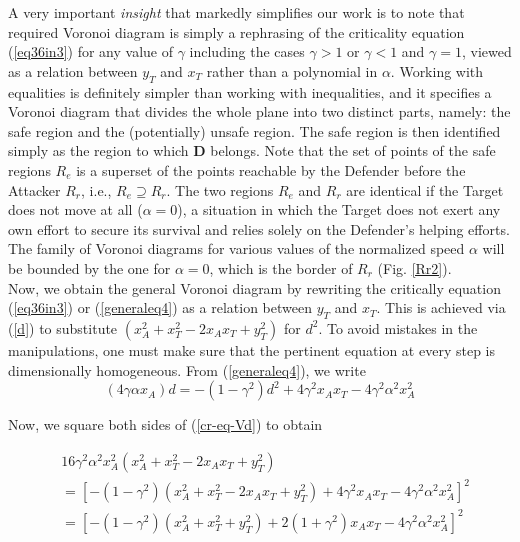 \documentclass[final,5p,times,twocolumn]{elsarticle}
\begin{document}
A very important \textit{insight} that markedly simplifies our work is to note that required Voronoi diagram is simply a rephrasing of the criticality equation (\ref{eq36in3}) for any value of $\gamma$ including the cases $\gamma>1$ or $\gamma<1$ and $\gamma=1$, viewed as a relation between $y_{T}$ and $x_{T}$ rather than a polynomial in $\alpha$. Working with equalities is definitely simpler than working with inequalities, and it specifies a Voronoi diagram that divides the whole plane into two distinct parts, namely: the safe region and the (potentially) unsafe region. The safe region is then identified simply as the region to which $\boldsymbol{D}$ belongs. Note that the set of points of the safe regions $R_{e}$ is a superset of the points reachable by the Defender before the Attacker $R_{r}$, i.e., $R_{e}\supseteq R_{r}$. The two regions $R_{e}$ and $R_{r}$ are identical if the Target does not move at all ($\alpha=0$), a situation in which the Target does not exert any own effort to secure its survival and relies solely on the Defender's helping efforts. The family of Voronoi diagrams for various values of the normalized speed $\alpha$ will be bounded by the one for $\alpha=0$, which is the border of $R_r$ (Fig. \ref{Rr2}).\\
Now, we obtain the general Voronoi diagram by rewriting the critically equation (\ref{eq36in3}) or (\ref{generaleq4}) as a relation between $y_{T}$ and $x_{T}$. This is achieved via (\ref{d}) to substitute $(x_{A}^{2}+x_{T}^{2}-2x_{A}x_{T}+y_{T}^{2})$ for $d^{2}$. To avoid mistakes in the manipulations, one must make sure that the pertinent equation at every step is dimensionally homogeneous. From (\ref{generaleq4}), we write
\begin{equation}
(4\gamma \alpha x_{A})d= -(1-\gamma^{2})d^{2}
+4 \gamma^{2} x_{A} x_{T}
-4 \gamma^{2} \alpha^{2} x_{A}^{2}
\label{cr-eq-Vd}
\end{equation}

Now, we square both sides of (\ref{cr-eq-Vd}) to obtain

\begin{equation}
\begin{split}
&16 \gamma^{2} \alpha^{2} x_{A}^{2} (x_{A}^{2} +x_{T}^{2}-2x_{A}x_{T}+y_{T}^{2})\\
&=[-(1-\gamma^{2})(x_{A}^{2} +x_{T}^{2}-2x_{A}x_{T}+y_{T}^{2})+4 \gamma^{2} x_{A} x_{T}-4 \gamma^{2} \alpha^{2} x_{A}^{2}]^{2}\\
&=[-(1-\gamma^{2})(x_{A}^{2}+x_{T}^{2}+y_{T}^{2})+2(1+\gamma^{2})x_{A}x_{T}-4 \gamma^{2} \alpha^{2} x_{A}^{2}]^{2}
\end{split}
\label{poly1}
\end{equation}
\end{document}
